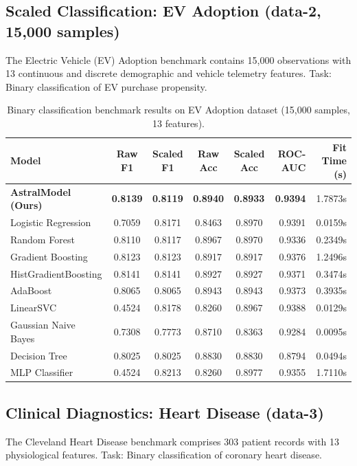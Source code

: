 \documentclass[11pt,a4paper]{article}
\begin{document}
\subsection{Scaled Classification: EV Adoption (data-2, 15,000 samples)}

The Electric Vehicle (EV) Adoption benchmark contains 15,000 observations with 13 continuous and discrete demographic and vehicle telemetry features. Task: Binary classification of EV purchase propensity.

\begin{table}[h]
\centering
\small
\caption{Binary classification benchmark results on EV Adoption dataset (15,000 samples, 13 features).}
\label{tab:ev}
\begin{tabular}{lccccrr}
\toprule
\textbf{Model} & \textbf{Raw F1} & \textbf{Scaled F1} & \textbf{Raw Acc} & \textbf{Scaled Acc} & \textbf{ROC-AUC} & \textbf{Fit Time (s)} \\
\midrule
\textbf{AstralModel (Ours)} & \textbf{0.8139} & \textbf{0.8119} & \textbf{0.8940} & \textbf{0.8933} & \textbf{0.9394} & 1.7873s \\
Logistic Regression & 0.7059 & 0.8171 & 0.8463 & 0.8970 & 0.9391 & 0.0159s \\
Random Forest & 0.8110 & 0.8117 & 0.8967 & 0.8970 & 0.9336 & 0.2349s \\
Gradient Boosting & 0.8123 & 0.8123 & 0.8917 & 0.8917 & 0.9376 & 1.2496s \\
HistGradientBoosting & 0.8141 & 0.8141 & 0.8927 & 0.8927 & 0.9371 & 0.3474s \\
AdaBoost & 0.8065 & 0.8065 & 0.8943 & 0.8943 & 0.9373 & 0.3935s \\
LinearSVC & 0.4524 & 0.8178 & 0.8260 & 0.8967 & 0.9388 & 0.0129s \\
Gaussian Naive Bayes & 0.7308 & 0.7773 & 0.8710 & 0.8363 & 0.9284 & 0.0095s \\
Decision Tree & 0.8025 & 0.8025 & 0.8830 & 0.8830 & 0.8794 & 0.0494s \\
MLP Classifier & 0.4524 & 0.8213 & 0.8260 & 0.8977 & 0.9355 & 1.7110s \\
\bottomrule
\end{tabular}
\end{table}

\subsection{Clinical Diagnostics: Heart Disease (data-3)}

The Cleveland Heart Disease benchmark comprises 303 patient records with 13 physiological features. Task: Binary classification of coronary heart disease.
\end{document}

